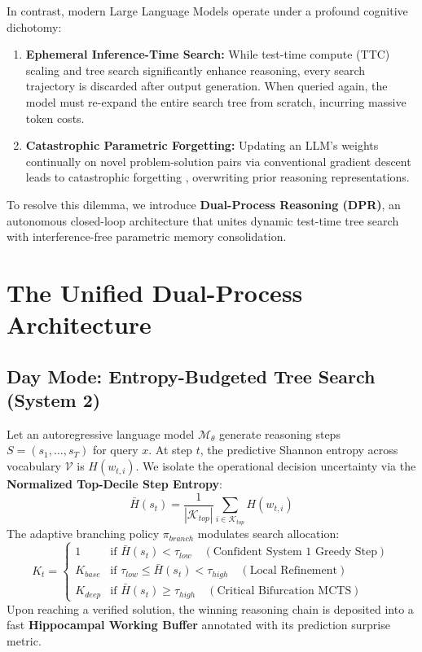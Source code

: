\documentclass{article}
\begin{document}
In contrast, modern Large Language Models operate under a profound cognitive dichotomy:
\begin{enumerate}
    \item \textbf{Ephemeral Inference-Time Search:} While test-time compute (TTC) scaling \citep{snell2024scaling, deepseek2025r1} and tree search \citep{yao2024tree} significantly enhance reasoning, every search trajectory is discarded after output generation. When queried again, the model must re-expand the entire search tree from scratch, incurring massive token costs.
    \item \textbf{Catastrophic Parametric Forgetting:} Updating an LLM's weights continually on novel problem-solution pairs via conventional gradient descent leads to catastrophic forgetting \citep{kirkpatrick2017overcoming}, overwriting prior reasoning representations.
\end{enumerate}

To resolve this dilemma, we introduce \textbf{Dual-Process Reasoning (DPR)}, an autonomous closed-loop architecture that unites dynamic test-time tree search with interference-free parametric memory consolidation.

\section{The Unified Dual-Process Architecture}

\subsection{Day Mode: Entropy-Budgeted Tree Search (System 2)}
Let an autoregressive language model $\mathcal{M}_\theta$ generate reasoning steps $S = (s_1, \dots, s_T)$ for query $x$. At step $t$, the predictive Shannon entropy across vocabulary $\mathcal{V}$ is $H(w_{t,i})$. We isolate the operational decision uncertainty via the \textbf{Normalized Top-Decile Step Entropy}:
\begin{equation}
    \bar{H}(s_t) = \frac{1}{|\mathcal{K}_{top}|} \sum_{i \in \mathcal{K}_{top}} H(w_{t,i})
\end{equation}
The adaptive branching policy $\pi_{branch}$ modulates search allocation:
\begin{equation}
    K_t = \begin{cases}
        1 & \text{if } \bar{H}(s_t) < \tau_{low} \quad (\text{Confident System 1 Greedy Step}) \\
        K_{base} & \text{if } \tau_{low} \le \bar{H}(s_t) < \tau_{high} \quad (\text{Local Refinement}) \\
        K_{deep} & \text{if } \bar{H}(s_t) \ge \tau_{high} \quad (\text{Critical Bifurcation MCTS})
    \end{cases}
\end{equation}
Upon reaching a verified solution, the winning reasoning chain is deposited into a fast \textbf{Hippocampal Working Buffer} annotated with its prediction surprise metric.
\end{document}

